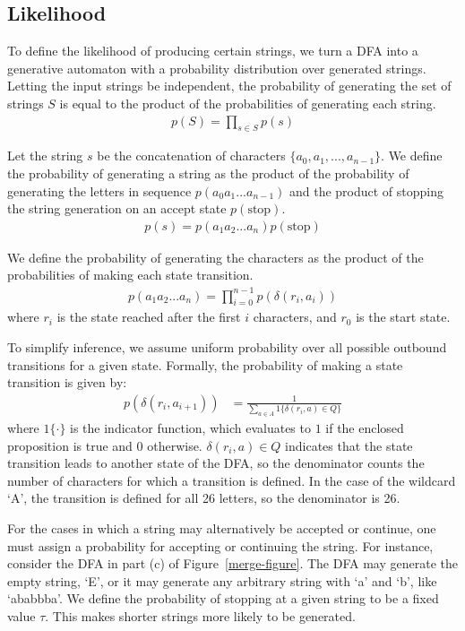 \documentclass[10pt,letterpaper]{article}
\begin{document}
\subsection{Likelihood}
To define the likelihood of producing certain strings, we turn a DFA into a generative automaton with a probability distribution over generated strings. Letting the input strings be independent, the probability of generating the set of strings $S$ is equal to the product of the probabilities of generating each string.
\begin{align*}
	p(S) = \prod_{s \in S} p(s)
\end{align*}

Let the string $s$ be the concatenation of characters $\{a_0,a_1,...,a_{n-1}\}$. We define the probability of generating a string as the product of the probability of generating the letters in sequence $p(a_0a_1...a_{n-1})$ and the product of stopping the string generation on an accept state $p(\text{stop})$.
\begin{align*}
	p(s) = p(a_1a_2...a_n)p(\text{stop})
\end{align*}

We define the probability of generating the characters as the product of the probabilities of making each state transition.
\begin{align*}
	p(a_1a_2 ... a_n) = \prod_{i=0}^{n-1}p(\delta(r_i, a_i))
\end{align*}
where $r_i$ is the state reached after the first $i$ characters, and $r_0$ is the start state.


To simplify inference, we assume uniform probability over all possible outbound transitions for a given state. Formally, the probability of making a state transition is given by:
\begin{align*}
	p(\delta(r_i, a_{i+1})) &= \frac{1}{\sum_{a\in A} 1\{\delta(r_i, a)\in Q\}}
\end{align*}
where $1\{\cdot\}$ is the indicator function, which evaluates to $1$ if the enclosed proposition is true and $0$ otherwise. $\delta(r_i, a)\in Q$ indicates that the state transition leads to another state of the DFA, so the denominator counts the number of characters for which a transition is defined. In the case of the wildcard `A', the transition is defined for all 26 letters, so the denominator is 26.

For the cases in which a string may alternatively be accepted or continue, one must assign a probability for accepting or continuing the string. For instance, consider the DFA in part (c) of Figure~\ref{merge-figure}. The DFA may generate the empty string, `E', or it may generate any arbitrary string with `a' and `b', like `ababbba'. We define the probability of stopping at a given string to be a fixed value $\tau$. This makes shorter strings more likely to be generated.
\end{document}
